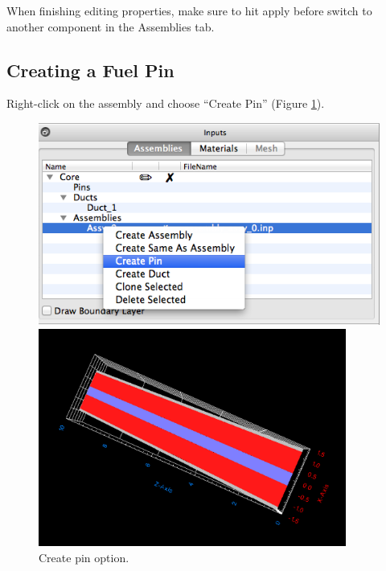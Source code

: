 \begin{commonerrors}
	When finishing editing properties, make sure to hit 
	apply before switch to another component in the Assemblies tab.
\end{commonerrors}


\subsection{Creating a Fuel Pin}

Right-click on the assembly and choose ``Create Pin'' (Figure \ref{fig:rectCreatePin}).

\begin{figure}
\centering
\begin{minipage}{.45\textwidth}
       \begin{center}
	\includegraphics[width=0.9\linewidth]{Images/rect-create-pin-option.png}
	\caption{Create pin option.}
	\label{fig:rectCreatePin}
     \end{center}
\vspace{20pt}
     \begin{center}
	 \includegraphics[width=0.9\textwidth]{Images/rect-pin.png}

\end{center}
\end{minipage}
\end{figure}
